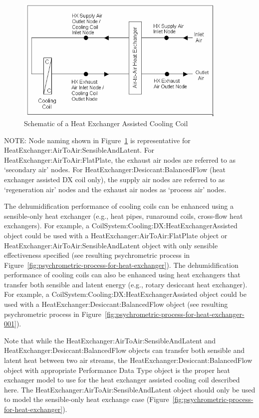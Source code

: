 \begin{figure}[hbtp] %
\centering
\includegraphics[width=0.9\textwidth, height=0.9\textheight, keepaspectratio=true]{media/image4091.png}
\caption{Schematic of a Heat Exchanger Assisted Cooling Coil \protect \label{fig:schematic-of-a-heat-exchanger-assisted}}
\end{figure}

NOTE: Node naming shown in Figure~\ref{fig:schematic-of-a-heat-exchanger-assisted} is representative for \\
HeatExchanger:AirToAir:SensibleAndLatent. For HeatExchanger:AirToAir:FlatPlate, the exhaust air nodes are referred to as `secondary air' nodes. For HeatExchanger:Desiccant:BalancedFlow (heat exchanger assisted DX coil only), the supply air nodes are referred to as `regeneration air' nodes and the exhaust air nodes as `process air' nodes.

The dehumidification performance of cooling coils can be enhanced using a sensible-only heat exchanger (e.g., heat pipes, runaround coils, cross-flow heat exchangers). For example, a CoilSystem:Cooling:DX:HeatExchangerAssisted object could be used with a HeatExchanger:AirToAir:FlatPlate object or HeatExchanger:AirToAir:SensibleAndLatent object with only sensible effectiveness specified (see resulting psychrometric process in Figure~\ref{fig:psychrometric-process-for-heat-exchanger}). The dehumidification performance of cooling coils can also be enhanced using heat exchangers that transfer both sensible and latent energy (e.g., rotary desiccant heat exchanger). For example, a CoilSystem:Cooling:DX:HeatExchangerAssisted object could be used with a HeatExchanger:Desiccant:BalancedFlow object (see resulting psychrometric process in Figure~\ref{fig:psychrometric-process-for-heat-exchanger-001}).

Note that while the HeatExchanger:AirToAir:SensibleAndLatent and HeatExchanger:Desiccant:BalancedFlow objects can transfer both sensible and latent heat between two air streams, the HeatExchanger:Desiccant:BalancedFlow object with appropriate Performance Data Type object is the proper heat exchanger model to use for the heat exchanger assisted cooling coil described here. The HeatExchanger:AirToAir:SensibleAndLatent object should only be used to model the sensible-only heat exchange case (Figure~\ref{fig:psychrometric-process-for-heat-exchanger}).

